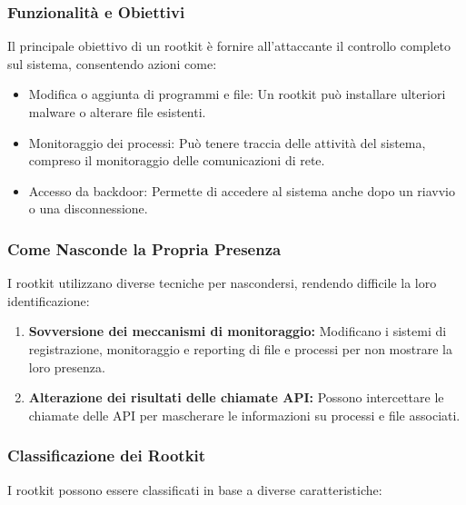 \subsubsection{Funzionalità e Obiettivi}

Il principale obiettivo di un rootkit è fornire all'attaccante il controllo completo sul sistema, consentendo azioni come:

\begin{itemize}
    \item Modifica o aggiunta di programmi e file: Un rootkit può installare ulteriori malware o alterare file esistenti.
    \item Monitoraggio dei processi: Può tenere traccia delle attività del sistema, compreso il monitoraggio delle comunicazioni di rete.
    \item Accesso da backdoor: Permette di accedere al sistema anche dopo un riavvio o una disconnessione.
\end{itemize}

\subsubsection{Come Nasconde la Propria Presenza}

I rootkit utilizzano diverse tecniche per nascondersi, rendendo difficile la loro identificazione:

\begin{enumerate}
    \item \textbf{Sovversione dei meccanismi di monitoraggio:} Modificano i sistemi di registrazione, monitoraggio e reporting di file e processi per non mostrare la loro presenza.
    \item \textbf{Alterazione dei risultati delle chiamate API:} Possono intercettare le chiamate delle API per mascherare le informazioni su processi e file associati.
\end{enumerate}

\subsubsection{Classificazione dei Rootkit}

I rootkit possono essere classificati in base a diverse caratteristiche:


